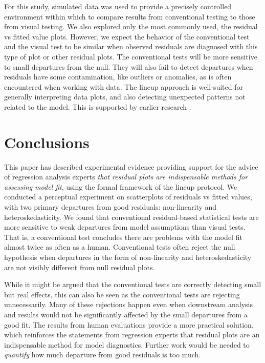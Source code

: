 \documentclass[]{interact}
\theoremstyle{plain}%
\theoremstyle{definition}
\theoremstyle{remark}
\begin{document}
For this study, simulated data was used to provide a precisely
controlled environment within which to compare results from conventional
testing to those from visual testing. We also explored only the most
commonly used, the residual vs fitted value plots. However, we expect
the behavior of the conventional test and the visual test to be similar
when observed residuals are diagnosed with this type of plot or other
residual plots. The conventional tests will be more sensitive to small
departures from the null. They will also fail to detect departures when
residuals have some contamination, like outliers or anomalies, as is
often encountered when working with data. The lineup approach is
well-suited for generally interpreting data plots, and also detecting
unexpected patterns not related to the model. This is supported by
earlier research
\citep[e.g.][]{wickham2010, roy2015using, loy2015you, VanderPlas2015, loy2016variations}.

\hypertarget{conclusions}{%
\section{Conclusions}\label{conclusions}}

This paper has described experimental evidence providing support for the
advice of regression analysis experts \emph{that residual plots are
indispensable methods for assessing model fit}, using the formal
framework of the lineup protocol. We conducted a perceptual experiment
on scatterplots of residuals vs fitted values, with two primary
departures from good residuals: non-linearity and heteroskedasticity. We
found that conventional residual-based statistical tests are more
sensitive to weak departures from model assumptions than visual tests.
That is, a conventional test concludes there are problems with the model
fit almost twice as often as a human. Conventional tests often reject
the null hypothesis when departures in the form of non-linearity and
heteroskedasticity are not visibly different from null residual plots.

While it might be argued that the conventional tests are correctly
detecting small but real effects, this can also be seen as the
conventional tests are rejecting unnecessarily. Many of these rejections
happen even when downstream analysis and results would not be
significantly affected by the small departures from a good fit. The
results from human evaluations provide a more practical solution, which
reinforces the statements from regression experts that residual plots
are an indispensable method for model diagnostics. Further work would be
needed to \emph{quantify} how much departure from good residuals is too
much.
\end{document}
